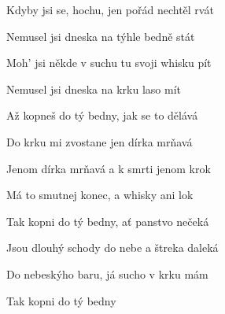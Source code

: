 \begin{song}
\bigskip

\Refren

\bigskip

Kdyby jsi se, hochu, jen pořád nechtěl rvát \par
{}Nemusel jsi dneska na týhle bedně stát \par
{}Moh' jsi někde v suchu tu svoji whisku pít \par
{}Nemusel jsi dneska na krku laso mít \par

\bigskip

\Refren

\bigskip

Až kopneš do tý bedny, jak se to dělává \par
{}Do krku mi zvostane jen dírka mrňavá \par
{}Jenom dírka mrňavá a k smrti jenom krok \par
{}Má to smutnej konec, a whisky ani lok \par

\bigskip

Tak kopni do tý bedny, ať panstvo nečeká \par
Jsou dlouhý schody do nebe a štreka daleká \par
Do nebeskýho baru, já sucho v krku mám \par
Tak kopni do tý bedny

\end{song}
